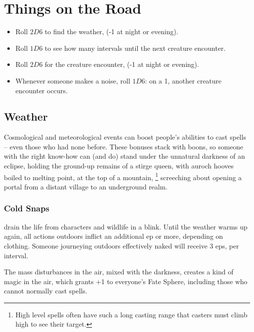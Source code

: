\section{Things on the Road}
\label{randomEncounters}

\begin{multicols}{2}

\begin{itemize}
  \item
  Roll $2D6$ to find the weather,  (-1 at night or evening).
  \item
  Roll $1D6$ to see how many \glspl{interval} until the next creature encounter.
  \item
  Roll $2D6$ for the creature encounter,  (-1 at night or evening).
  \item
  Whenever someone makes a noise, roll $1D6$: on a 1, another creature encounter occurs.
\end{itemize}

\subsection{Weather}
\label{weather}
Cosmological and meteorological events can boost people's abilities to cast spells -- even those who had none before.
These bonuses stack with \glspl{boon}, so someone with the right know-how can (and do) stand under the unnatural darkness of an eclipse, holding the ground-up remains of a stirge queen, with auroch hooves boiled to melting point, at the top of a mountain,%
\footnote{High level spells often have such a long casting range that casters must climb high to see their target.}
screeching about opening a portal from a distant \gls{village} to an underground realm.

\subsubsection{Cold Snaps}
drain the life from characters and wildlife in a blink.
Until the weather warms up again, all actions outdoors inflict an additional \gls{ep} or more, depending on clothing.
Someone journeying outdoors effectively naked will receive 3 \glspl{ep}, per \gls{interval}.

The mass disturbances in the air, mixed with the darkness, creates a kind of magic in the air, which grants +1 to everyone's Fate Sphere, including those who cannot normally cast spells.


\end{multicols}

